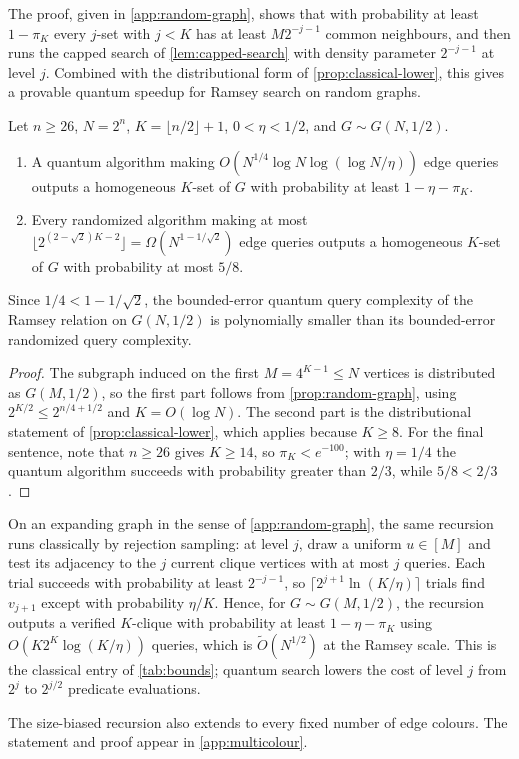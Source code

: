 The proof, given in \cref{app:random-graph}, shows that with probability
at least $1-\pi_K$ every $j$-set with $j<K$ has at least $M2^{-j-1}$ common
neighbours, and then runs the capped search of \cref{lem:capped-search}
with density parameter $2^{-j-1}$ at level $j$.  Combined with the
distributional form of \cref{prop:classical-lower}, this gives a provable
quantum speedup for Ramsey search on random graphs.

\begin{corollary}
\label{cor:separation}
Let $n\ge26$, $N=2^n$, $K=\lfloor n/2\rfloor+1$, $0<\eta<1/2$, and
$G\sim G(N,1/2)$.
\begin{enumerate}
\item A quantum algorithm making
$O(N^{1/4}\log N\log(\log N/\eta))$ edge queries outputs a homogeneous
$K$-set of $G$ with probability at least $1-\eta-\pi_K$.
\item Every randomized algorithm making at most
$\lfloor2^{(2-\sqrt2)K-2}\rfloor=\Omega(N^{1-1/\sqrt2})$ edge queries
outputs a homogeneous $K$-set of $G$ with probability at most $5/8$.
\end{enumerate}
Since $1/4<1-1/\sqrt2$, the bounded-error quantum query complexity of the
Ramsey relation on $G(N,1/2)$ is polynomially smaller than its bounded-error
randomized query complexity.
\end{corollary}

\begin{proof}
The subgraph induced on the first $M=4^{K-1}\le N$ vertices is distributed
as $G(M,1/2)$, so the first part follows from \cref{prop:random-graph},
using $2^{K/2}\le2^{n/4+1/2}$ and $K=O(\log N)$.  The second part is the
distributional statement of \cref{prop:classical-lower}, which applies
because $K\ge8$.  For the final sentence, note that $n\ge26$ gives
$K\ge14$, so $\pi_K<e^{-100}$; with $\eta=1/4$ the quantum algorithm
succeeds with probability greater than $2/3$, while $5/8<2/3$.
\end{proof}

\begin{remark}\label{rem:classical-greedy}
On an expanding graph in the sense of \cref{app:random-graph}, the same
recursion runs classically by rejection sampling: at level $j$, draw a
uniform $u\in[M]$ and test its adjacency to the $j$ current clique vertices
with at most $j$ queries.  Each trial succeeds with probability at least
$2^{-j-1}$, so $\lceil2^{j+1}\ln(K/\eta)\rceil$ trials find $v_{j+1}$ except
with probability $\eta/K$.  Hence, for $G\sim G(M,1/2)$, the recursion
outputs a verified $K$-clique with probability at least $1-\eta-\pi_K$
using $O(K2^K\log(K/\eta))$ queries, which is $\widetilde O(N^{1/2})$ at
the Ramsey scale.  This is the classical entry of \cref{tab:bounds}; quantum
search lowers the cost of level $j$ from $2^{j}$ to $2^{j/2}$ predicate
evaluations.
\end{remark}

The size-biased recursion also extends to every fixed number of edge colours.
The statement and proof appear in \cref{app:multicolour}.
